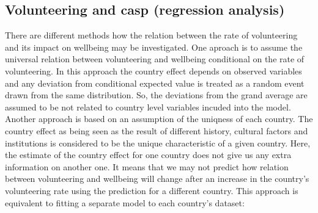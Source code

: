 \documentclass[10pt, letterpaper]{article}
\begin{document}
\begin{spacing}{1.4}




\subsection*{Volunteering and casp (regression analysis)}

There are different methods how the relation between the rate of volunteering and its impact on wellbeing may be investigated. One aproach is to assume the universal relation between volunteering and wellbeing conditional on the rate of volunteering. In this approach the country effect depends on observed variables and any deviation from conditional expected value is treated as a random event drawn from the same distribution. So, the deviations from the grand average are assumed to be not related to country level variables incuded into the model. \\

Another approach is based on an assumption of the uniqness of each country. The country effect as being seen as the result of different history, cultural factors and institutions is considered to be the unique characteristic of a given country. Here, the estimate of the country effect for one country does not give us any extra information on another one. It means that we may not predict how relation between volunteering and wellbeing will change  after an increase in the country's volunteering rate using the prediction for a different country. This approach is equivalent to fitting a separate model to each country’s dataset:  


\end{spacing}
\end{document}
